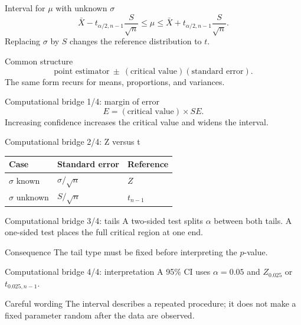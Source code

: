 \documentclass[10pt,aspectratio=169]{beamer}
\begin{document}
\begin{frame}{Interval for $\mu$ with unknown $\sigma$}
  \footnotesize
  \[
    \bar X-t_{\alpha/2,n-1}\frac{S}{\sqrt n}
    \le\mu\le
    \bar X+t_{\alpha/2,n-1}\frac{S}{\sqrt n}.
  \]
  Replacing $\sigma$ by $S$ changes the reference distribution to $t$.
\end{frame}

\begin{frame}{Common structure}
  \footnotesize
  \[
    \text{point estimator}\ \pm\ (\text{critical value})
    (\text{standard error}).
  \]
  The same form recurs for means, proportions, and variances.
\end{frame}

\begin{frame}{Computational bridge 1/4: margin of error}
  \footnotesize
  \[
    E=(\text{critical value})\times SE.
  \]
  Increasing confidence increases the critical value and widens the interval.
\end{frame}

\begin{frame}{Computational bridge 2/4: Z versus t}
  \footnotesize
  \begin{tabular}{lll}
    \hline
    Case & Standard error & Reference \\
    \hline
    $\sigma$ known & $\sigma/\sqrt n$ & $Z$ \\
    $\sigma$ unknown & $S/\sqrt n$ & $t_{n-1}$ \\
    \hline
  \end{tabular}
\end{frame}

\begin{frame}{Computational bridge 3/4: tails}
  \footnotesize
  A two-sided test splits $\alpha$ between both tails. A one-sided test places
  the full critical region at one end.
  \begin{block}{Consequence}
    The tail type must be fixed before interpreting the $p$-value.
  \end{block}
\end{frame}

\begin{frame}{Computational bridge 4/4: interpretation}
  \footnotesize
  A 95\% CI uses $\alpha=0.05$ and $Z_{0.025}$ or $t_{0.025,n-1}$.
  \begin{alertblock}{Careful wording}
    The interval describes a repeated procedure; it does not make a fixed
    parameter random after the data are observed.
  \end{alertblock}
\end{frame}
\end{document}
